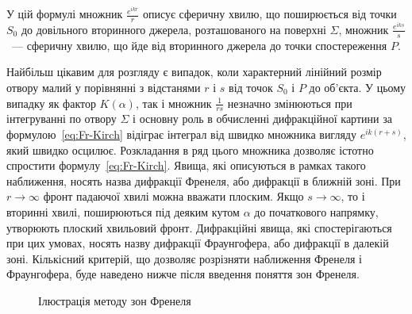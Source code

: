 У цій формулі множник $\frac{e^{ikr}}{r}$ описує сферичну хвилю, що поширюється від точки $S_0$ до довільного вторинного джерела, розташованого на поверхні $\Sigma$, множник $\frac{e^{iks}}{s}$~--- сферичну хвилю, що йде від вторинного джерела до точки спостереження $P$.

Найбільш цікавим для розгляду є випадок, коли характерний лінійний розмір отвору малий у порівнянні з відстанями $r$ і $s$ від точок $S_0$ і $P$ до об'єкта. У цьому випадку як фактор $K(\alpha)$, так і множник $\frac{1}{rs}$ незначно змінюються при інтегруванні по отвору $\Sigma$ і основну роль в обчисленні дифракційної картини за формулою~\eqref{eq:Fr-Kirch} відіграє інтеграл від швидко множника вигляду $e^{ik(r+s)}$, який швидко осцилює. Розкладання в ряд цього множника дозволяє істотно спростити формулу~\eqref{eq:Fr-Kirch}. Явища, які описуються в рамках такого наближення, носять назва дифракції Френеля, або дифракції в ближній зоні. При $r \to \infty$ фронт падаючої хвилі можна вважати плоским. Якщо $s \to \infty$, то і вторинні хвилі, поширюються під деяким кутом $\alpha$ до початкового напрямку, утворюють плоский хвильовий фронт. Дифракційні явища, які спостерігаються при цих умовах, носять назву дифракції Фраунгофера, або дифракції в далекій зоні. Кількісний критерій, що дозволяє розрізняти наближення Френеля і Фраунгофера, буде наведено нижче після введення поняття зон Френеля.

\begin{figure}[hb!]
    \centering
    \caption{Ілюстрація методу зон Френеля}
    \label{pic:Diffraction2}
\end{figure}





